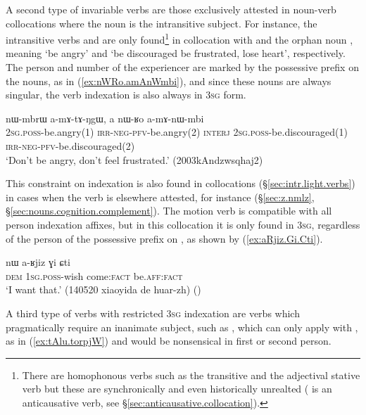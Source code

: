 A second type of invariable verbs are those exclusively attested in noun-verb collocations where the noun is the intransitive subject. For instance, the intransitive verbs  and  are only found\footnote{There are homophonous verbs such as the transitive  and the adjectival stative verb  but these are synchronically and even historically unrealted ( is an anticausative verb, see §\ref{sec:anticausative.collocation}).  } in collocation with  and the orphan noun , meaning `be angry' and `be discouraged be frustrated, lose heart', respectively. The person and number of the experiencer are marked by the possessive prefix on the nouns, as in (\ref{ex:nWRo.amAnWmbi}), and since these nouns are always singular, the verb indexation is also always in \textsc{3sg} form.

\begin{exe}
\ex   \label{ex:nWRo.amAnWmbi}
\gll  nɯ-mbrɯ a-mɤ-tɤ-ŋgɯ, a nɯ-ʁo a-mɤ-nɯ-mbi \\
\textsc{2sg}.\textsc{poss}-be.angry(1) \textsc{irr}-\textsc{neg}-\textsc{pfv}-be.angry(2) \textsc{interj} \textsc{2sg}.\textsc{poss}-be.discouraged(1) \textsc{irr}-\textsc{neg}-\textsc{pfv}-be.discouraged(2)  \\
\glt `Don't be angry, don't feel frustrated.' (2003kAndzwsqhaj2)
\end{exe}

This constraint on indexation is also found in collocations (§\ref{sec:intr.light.verbs}) in cases when the verb is elsewhere attested, for instance  (§\ref{sec:z.nmlz}, §\ref{sec:nouns.cognition.complement}). The motion verb  is compatible with all person indexation affixes, but in this collocation it is only found in \textsc{3sg}, regardless of the person of the possessive prefix on , as shown by (\ref{ex:aRjiz.Gi.Cti}).

\begin{exe}
\ex   \label{ex:aRjiz.Gi.Cti}
\gll   nɯ a-ʁjiz ɣi ɕti \\
\textsc{dem} \textsc{1sg}.\textsc{poss}-wish come:\textsc{fact} be.\textsc{aff}:\textsc{fact} \\
\glt `I want that.' (140520 xiaoyida de huar-zh) ()
\end{exe}

A third type of verbs with restricted \textsc{3sg} indexation are verbs which pragmatically require an inanimate subject, such as , which can only apply with , as in (\ref{ex:tAlu.torpjW}) and would be nonsensical in first or second person.

